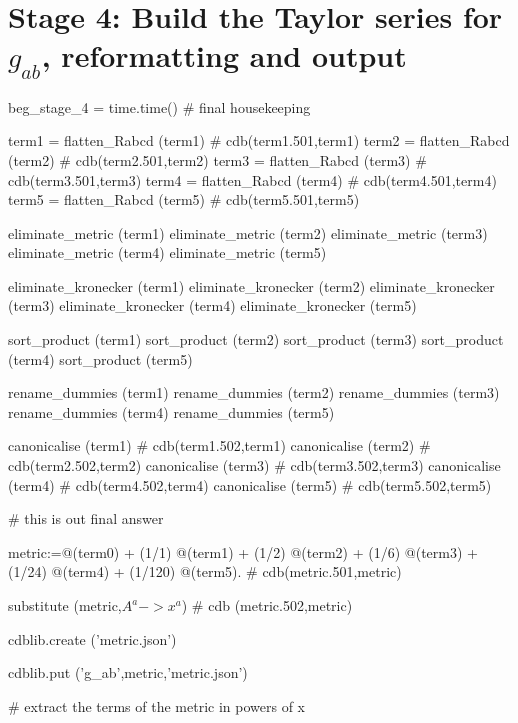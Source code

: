 \documentclass[12pt]{cdblatex}
\begin{document}
\clearpage

\section*{Stage 4: Build the Taylor series for $g_{ab}$, reformatting and output}

\begin{cadabra}
   beg_stage_4 = time.time()
   # final housekeeping

   term1 = flatten_Rabcd (term1)         # cdb(term1.501,term1)
   term2 = flatten_Rabcd (term2)         # cdb(term2.501,term2)
   term3 = flatten_Rabcd (term3)         # cdb(term3.501,term3)
   term4 = flatten_Rabcd (term4)         # cdb(term4.501,term4)
   term5 = flatten_Rabcd (term5)         # cdb(term5.501,term5)

   eliminate_metric (term1)
   eliminate_metric (term2)
   eliminate_metric (term3)
   eliminate_metric (term4)
   eliminate_metric (term5)

   eliminate_kronecker (term1)
   eliminate_kronecker (term2)
   eliminate_kronecker (term3)
   eliminate_kronecker (term4)
   eliminate_kronecker (term5)

   sort_product (term1)
   sort_product (term2)
   sort_product (term3)
   sort_product (term4)
   sort_product (term5)

   rename_dummies (term1)
   rename_dummies (term2)
   rename_dummies (term3)
   rename_dummies (term4)
   rename_dummies (term5)

   canonicalise (term1)                  # cdb(term1.502,term1)
   canonicalise (term2)                  # cdb(term2.502,term2)
   canonicalise (term3)                  # cdb(term3.502,term3)
   canonicalise (term4)                  # cdb(term4.502,term4)
   canonicalise (term5)                  # cdb(term5.502,term5)

   # this is out final answer

   metric:=@(term0)
         + (1/1) @(term1)
         + (1/2) @(term2)
         + (1/6) @(term3)
         + (1/24) @(term4)
         + (1/120) @(term5).             # cdb(metric.501,metric)

   substitute (metric,$A^{a} -> x^{a}$)  # cdb (metric.502,metric)

   cdblib.create ('metric.json')

   cdblib.put ('g_ab',metric,'metric.json')

   # extract the terms of the metric in powers of x


\end{cadabra}
\end{document}

